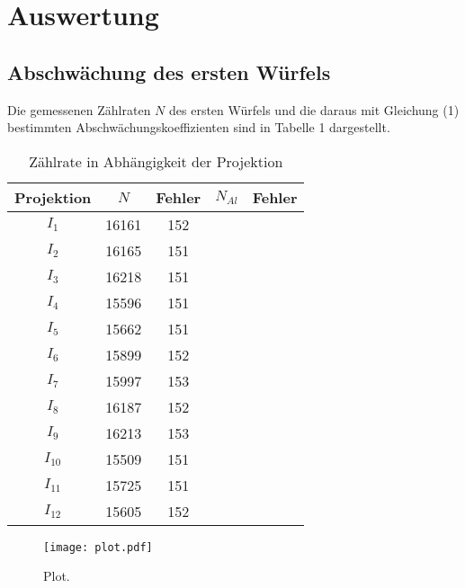 \section{Auswertung}
\label{sec:Auswertung}



\subsection{Abschwächung des ersten Würfels}
Die gemessenen Zählraten $N$ des ersten Würfels und die daraus mit Gleichung (1)
bestimmten Abschwächungskoeffizienten sind in Tabelle 1 dargestellt.

\begin{table}[H]
  \centering
  \caption{Zählrate in Abhängigkeit der Projektion}
  \label{tab:Parameter}
  \begin{tabular}{c c c| c c }
    \toprule
    Projektion & $N$ & Fehler & $N_{Al}$ & Fehler  \\
    \midrule
        $I_1$    & 16161 & 152 & &   \\
        $I_2$    & 16165 & 151 & &   \\
        $I_3$    & 16218 & 151 & &   \\
        $I_4$    & 15596 & 151 & &   \\
        $I_5$    & 15662 & 151 & &   \\
        $I_6$    & 15899 & 152 & &   \\
        $I_7$    & 15997 & 153 & &   \\
        $I_8$    & 16187 & 152 & &   \\
        $I_9$    & 16213 & 153 & &   \\
        $I_{10}$ & 15509 & 151 & &  \\
        $I_{11}$ & 15725 & 151 & &   \\
        $I_{12}$ & 15605 & 152 & &   \\
    \bottomrule
  \end{tabular}
\end{table}



\begin{figure}
  \centering
  \texttt{[image: plot.pdf]}
  \caption{Plot.}
  \label{fig:plot}
\end{figure}
